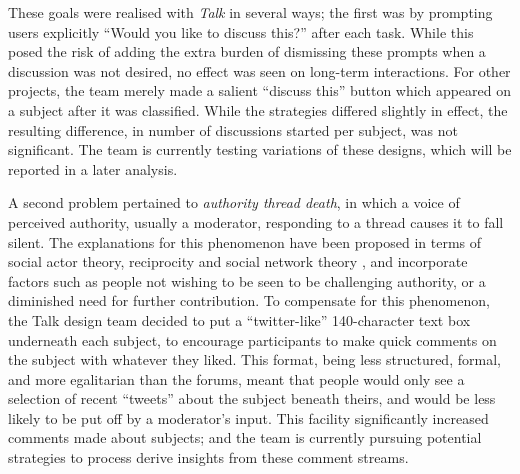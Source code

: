 \documentclass{sigchi}
\begin{document}
These goals were realised with \emph{Talk} in several ways; the first was by prompting users explicitly  ``Would you like to discuss this?'' after each task.  While this posed the risk of adding the extra burden of dismissing these prompts when a discussion was not desired, no effect was seen on long-term interactions.  For other projects, the team merely made a salient ``discuss this'' button which appeared on a subject after it was classified.  While the strategies differed slightly in effect, the resulting difference, in number of discussions started per subject, was not significant.  The team is currently testing variations of these designs, which will be reported in a later analysis.

A second problem pertained to \emph{authority thread death}, in which a voice of perceived authority, usually a moderator, responding to a thread causes it to fall silent.  The  explanations for this phenomenon have been proposed in terms of social actor theory,  reciprocity and social network theory \cite{preece2003online}, and incorporate factors such as people not wishing to be seen to be challenging authority, or a diminished need for further contribution.  To compensate for this phenomenon, the Talk design team decided to put a ``twitter-like'' 140-character text box underneath each subject, to encourage participants to make quick comments on the subject with whatever they liked.  This format, being less structured, formal, and more egalitarian than the forums, meant that people would only see a selection of recent ``tweets'' about the subject beneath theirs, and would be less likely to be put off by a moderator's input.  This facility significantly increased comments made about subjects; and the team is currently pursuing potential strategies to process  derive insights from these comment streams.


\end{document}
